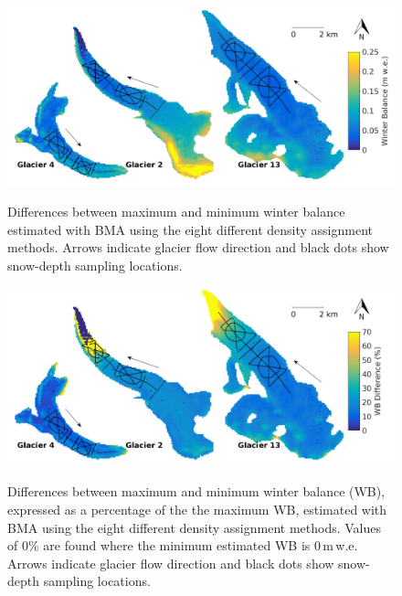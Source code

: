 \documentclass{sfuthesis}
\newcommand{\topomap}{Arrows indicate glacier flow direction and black dots show snow-depth sampling locations. }
\begin{document}
\begin{figure}[H]
	\centering
	\includegraphics[width =\textwidth]{BMS_SWEdifferenceMap.png}\\
	\caption[Differences between maximum and minimum winter balance estimated with BMA using the eight different density assignment methods]{Differences between maximum and minimum winter balance estimated with BMA using the eight different density assignment methods. \topomap}
	\label{fig:BMS_SWEdiffMap}
\end{figure} 
 
 \begin{figure}[H]
	\centering
	\includegraphics[width =\textwidth]{BMS_SWEdifferenceMap_percent.png}\\
	\caption[Differences between maximum and minimum winter balance (WB), expressed as a percentage of the the maximum WB, estimated with BMA using the eight different density assignment methods]{Differences between maximum and minimum winter balance (WB), expressed as a percentage of the the maximum WB, estimated with BMA using the eight different density assignment methods. Values of 0\% are found where the minimum estimated WB is 0\,m\,w.e. \topomap}
	\label{fig:BMS_SWEdiffMap_precent}
\end{figure} 
\end{document}
